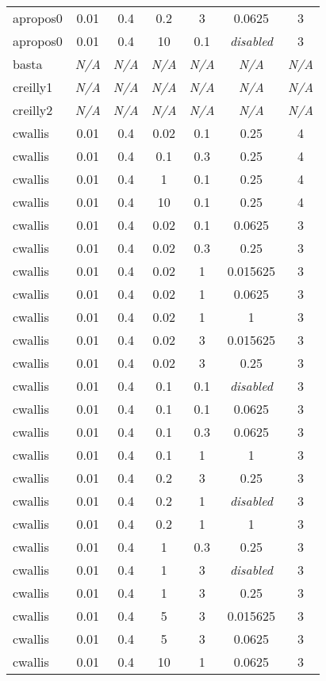 \begin{longtable}{@{}lcccccc@{}}
apropos0 & 0.01 & 0.4 & 0.2 & 3 & 0.0625 & 3 \\
apropos0 & 0.01 & 0.4 & 10 & 0.1 & \emph{disabled} & 3 \\
basta & \emph{N/A} & \emph{N/A} & \emph{N/A} & \emph{N/A} & \emph{N/A} & \emph{N/A} \\
creilly1 & \emph{N/A} & \emph{N/A} & \emph{N/A} & \emph{N/A} & \emph{N/A} & \emph{N/A} \\
creilly2 & \emph{N/A} & \emph{N/A} & \emph{N/A} & \emph{N/A} & \emph{N/A} & \emph{N/A} \\
cwallis & 0.01 & 0.4 & 0.02 & 0.1 & 0.25 & 4 \\
cwallis & 0.01 & 0.4 & 0.1 & 0.3 & 0.25 & 4 \\
cwallis & 0.01 & 0.4 & 1 & 0.1 & 0.25 & 4 \\
cwallis & 0.01 & 0.4 & 10 & 0.1 & 0.25 & 4 \\
cwallis & 0.01 & 0.4 & 0.02 & 0.1 & 0.0625 & 3 \\
cwallis & 0.01 & 0.4 & 0.02 & 0.3 & 0.25 & 3 \\
cwallis & 0.01 & 0.4 & 0.02 & 1 & 0.015625 & 3 \\
cwallis & 0.01 & 0.4 & 0.02 & 1 & 0.0625 & 3 \\
cwallis & 0.01 & 0.4 & 0.02 & 1 & 1 & 3 \\
cwallis & 0.01 & 0.4 & 0.02 & 3 & 0.015625 & 3 \\
cwallis & 0.01 & 0.4 & 0.02 & 3 & 0.25 & 3 \\
cwallis & 0.01 & 0.4 & 0.1 & 0.1 & \emph{disabled} & 3 \\
cwallis & 0.01 & 0.4 & 0.1 & 0.1 & 0.0625 & 3 \\
cwallis & 0.01 & 0.4 & 0.1 & 0.3 & 0.0625 & 3 \\
cwallis & 0.01 & 0.4 & 0.1 & 1 & 1 & 3 \\
cwallis & 0.01 & 0.4 & 0.2 & 3 & 0.25 & 3 \\
cwallis & 0.01 & 0.4 & 0.2 & 1 & \emph{disabled} & 3 \\
cwallis & 0.01 & 0.4 & 0.2 & 1 & 1 & 3 \\
cwallis & 0.01 & 0.4 & 1 & 0.3 & 0.25 & 3 \\
cwallis & 0.01 & 0.4 & 1 & 3 & \emph{disabled} & 3 \\
cwallis & 0.01 & 0.4 & 1 & 3 & 0.25 & 3 \\
cwallis & 0.01 & 0.4 & 5 & 3 & 0.015625 & 3 \\
cwallis & 0.01 & 0.4 & 5 & 3 & 0.0625 & 3 \\
cwallis & 0.01 & 0.4 & 10 & 1 & 0.0625 & 3 \\

\end{longtable}
